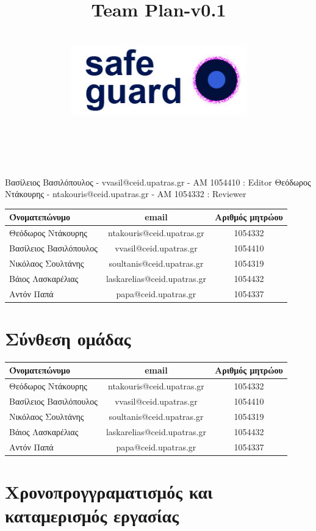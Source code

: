\documentclass{article}
\title{Team Plan-v0.1}
\author{\\
\includegraphics[width=3in]{safeguard}\\[1ex]\\\\
}
\begin{document}
\maketitle

\newpage

Βασίλειος Βασιλόπουλος - vvasil@ceid.upatras.gr - ΑΜ 1054410 : Editor
Θεόδωρος Ντάκουρης - ntakouris@ceid.upatras.gr - ΑΜ 1054332 : Reviewer

\begin{tabular}{|l|c|c|}
\hline
Όνοματεπώνυμο & email & Αριθμός μητρώου  \\
\hline
Θεόδωρος Ντάκουρης & ntakouris@ceid.upatras.gr & 1054332 \\
Βασίλειος Βασιλόπουλος & vvasil@ceid.upatras.gr &  1054410\\
Νικόλαος Σουλτάνης & soultanis@ceid.upatras.gr & 1054319  \\
Βάιος Λασκαρέλιας & laskarelias@ceid.upatras.gr & 1054432 \\
Αντόν Παπά & papa@ceid.upatras.gr & 1054337 \\
\hline
\end{tabular}



\renewcommand{\contentsname}{Περιεχόμενα}
\tableofcontents


\section{Σύνθεση ομάδας}
\begin{tabular}{|l|c|c|}
\hline
Όνοματεπώνυμο & email & Αριθμός μητρώου  \\
\hline
Θεόδωρος Ντάκουρης & ntakouris@ceid.upatras.gr & 1054332 \\
Βασίλειος Βασιλόπουλος & vvasil@ceid.upatras.gr &  1054410\\
Νικόλαος Σουλτάνης & soultanis@ceid.upatras.gr & 1054319  \\
Βάιος Λασκαρέλιας & laskarelias@ceid.upatras.gr & 1054432 \\
Αντόν Παπά & papa@ceid.upatras.gr & 1054337 \\
\hline
\end{tabular}

\section{Χρονοπρογγραματισμός και καταμερισμός εργασίας}
\end{document}
